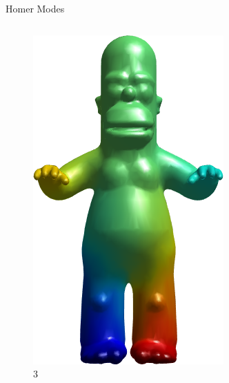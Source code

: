 \documentclass{beamer}
\begin{document}
\begin{frame}{Homer Modes}

\begin{columns}
\begin{column}[T]{3cm}
\begin{figure}[t]
    \includegraphics[width=\textwidth]{Harmonics/HomerModes/3.png}
    \caption*{\huge 3}
\end{figure}
\end{column}
\begin{column}[T]{3cm}
\begin{figure}[t]


\end{figure}
\end{column}
\end{columns}
\end{frame}
\end{document}
